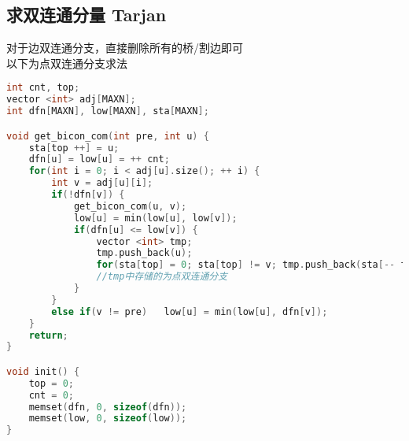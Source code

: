 \subsection{求双连通分量 Tarjan}
对于边双连通分支，直接删除所有的桥/割边即可\\
以下为点双连通分支求法
    \begin{lstlisting}[language=c++]
int cnt, top;
vector <int> adj[MAXN];
int dfn[MAXN], low[MAXN], sta[MAXN];

void get_bicon_com(int pre, int u) {
    sta[top ++] = u;
    dfn[u] = low[u] = ++ cnt;
    for(int i = 0; i < adj[u].size(); ++ i) {
        int v = adj[u][i];
        if(!dfn[v]) {
            get_bicon_com(u, v);
            low[u] = min(low[u], low[v]);
            if(dfn[u] <= low[v]) {
                vector <int> tmp;
                tmp.push_back(u);
                for(sta[top] = 0; sta[top] != v; tmp.push_back(sta[-- top]));
                //tmp中存储的为点双连通分支
            }
        }
        else if(v != pre)   low[u] = min(low[u], dfn[v]);
    }
    return;
}

void init() {
    top = 0;
    cnt = 0;
    memset(dfn, 0, sizeof(dfn));
    memset(low, 0, sizeof(low));
}
    \end{lstlisting}
